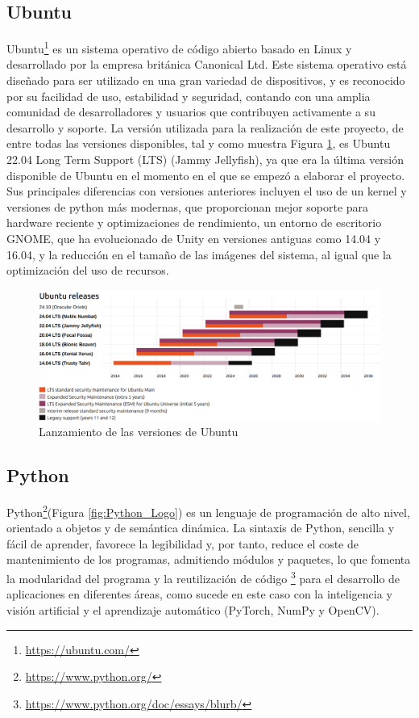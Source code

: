\subsection{Ubuntu}
\label{sec:ubuntu}
Ubuntu\footnote{\url{https://ubuntu.com/}} es un sistema operativo de código abierto basado en Linux y desarrollado por la empresa británica Canonical Ltd. 
Este sistema operativo está diseñado para ser utilizado en una gran variedad de dispositivos, y es reconocido por su facilidad de uso, estabilidad y seguridad, contando con una amplia comunidad de desarrolladores y usuarios que contribuyen activamente a su desarrollo y soporte. La versión utilizada para la realización de este proyecto, de entre todas las versiones disponibles, tal y como muestra Figura \ref{fig:Ubuntu_Releases}, es Ubuntu 22.04 Long Term Support (LTS) (Jammy Jellyfish), ya que era la última versión disponible de Ubuntu en el momento en el que se empezó a elaborar el proyecto. Sus principales diferencias con versiones anteriores incluyen el uso de un kernel y versiones de python más modernas, que proporcionan mejor soporte para hardware reciente y optimizaciones de rendimiento, un entorno de escritorio GNOME, que ha evolucionado de Unity en versiones antiguas como 14.04 y 16.04, y  la reducción en el tamaño de las imágenes del sistema, al igual que la optimización del uso de recursos.\\

\begin{figure} [H]
    \begin{center}
      \includegraphics[width=16cm]{figs/Ubuntu Releases.png}
    \end{center}
    \caption{Lanzamiento de las versiones de Ubuntu}
    \label{fig:Ubuntu_Releases}
\end{figure}
\pagebreak


\subsection{Python}
\label{sec:python}
Python\footnote{\url{https://www.python.org/}}(Figura \ref{fig:Python_Logo}) es un lenguaje de programación de alto nivel, orientado a objetos y de semántica dinámica. La sintaxis de Python, sencilla y fácil de aprender, favorece la legibilidad y, por tanto, reduce el coste de mantenimiento de los programas, admitiendo módulos y paquetes, lo que fomenta la modularidad del programa y la reutilización de código \footnote{\url{https://www.python.org/doc/essays/blurb/}} para el desarrollo de aplicaciones en diferentes áreas, como sucede en este caso con la inteligencia y visión artificial y el aprendizaje automático (PyTorch, NumPy y OpenCV). 

